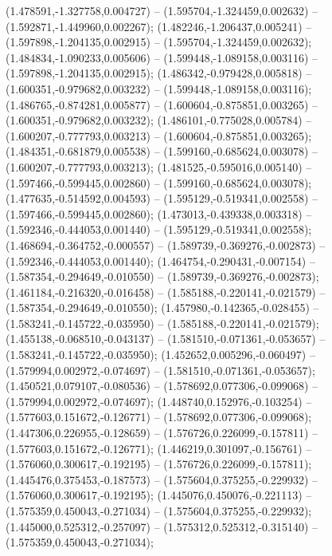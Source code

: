  (1.478591,-1.327758,0.004727) -- (1.595704,-1.324459,0.002632) -- (1.592871,-1.449960,0.002267);
 (1.482246,-1.206437,0.005241) -- (1.597898,-1.204135,0.002915) -- (1.595704,-1.324459,0.002632);
 (1.484834,-1.090233,0.005606) -- (1.599448,-1.089158,0.003116) -- (1.597898,-1.204135,0.002915);
 (1.486342,-0.979428,0.005818) -- (1.600351,-0.979682,0.003232) -- (1.599448,-1.089158,0.003116);
 (1.486765,-0.874281,0.005877) -- (1.600604,-0.875851,0.003265) -- (1.600351,-0.979682,0.003232);
 (1.486101,-0.775028,0.005784) -- (1.600207,-0.777793,0.003213) -- (1.600604,-0.875851,0.003265);
 (1.484351,-0.681879,0.005538) -- (1.599160,-0.685624,0.003078) -- (1.600207,-0.777793,0.003213);
 (1.481525,-0.595016,0.005140) -- (1.597466,-0.599445,0.002860) -- (1.599160,-0.685624,0.003078);
 (1.477635,-0.514592,0.004593) -- (1.595129,-0.519341,0.002558) -- (1.597466,-0.599445,0.002860);
 (1.473013,-0.439338,0.003318) -- (1.592346,-0.444053,0.001440) -- (1.595129,-0.519341,0.002558);
 (1.468694,-0.364752,-0.000557) -- (1.589739,-0.369276,-0.002873) -- (1.592346,-0.444053,0.001440);
 (1.464754,-0.290431,-0.007154) -- (1.587354,-0.294649,-0.010550) -- (1.589739,-0.369276,-0.002873);
 (1.461184,-0.216320,-0.016458) -- (1.585188,-0.220141,-0.021579) -- (1.587354,-0.294649,-0.010550);
 (1.457980,-0.142365,-0.028455) -- (1.583241,-0.145722,-0.035950) -- (1.585188,-0.220141,-0.021579);
 (1.455138,-0.068510,-0.043137) -- (1.581510,-0.071361,-0.053657) -- (1.583241,-0.145722,-0.035950);
 (1.452652,0.005296,-0.060497) -- (1.579994,0.002972,-0.074697) -- (1.581510,-0.071361,-0.053657);
 (1.450521,0.079107,-0.080536) -- (1.578692,0.077306,-0.099068) -- (1.579994,0.002972,-0.074697);
 (1.448740,0.152976,-0.103254) -- (1.577603,0.151672,-0.126771) -- (1.578692,0.077306,-0.099068);
 (1.447306,0.226955,-0.128659) -- (1.576726,0.226099,-0.157811) -- (1.577603,0.151672,-0.126771);
 (1.446219,0.301097,-0.156761) -- (1.576060,0.300617,-0.192195) -- (1.576726,0.226099,-0.157811);
 (1.445476,0.375453,-0.187573) -- (1.575604,0.375255,-0.229932) -- (1.576060,0.300617,-0.192195);
 (1.445076,0.450076,-0.221113) -- (1.575359,0.450043,-0.271034) -- (1.575604,0.375255,-0.229932);
 (1.445000,0.525312,-0.257097) -- (1.575312,0.525312,-0.315140) -- (1.575359,0.450043,-0.271034);
